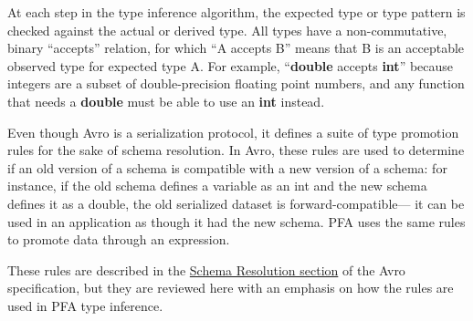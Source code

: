 \documentclass{article}
\theoremstyle{definition}
\begin{document}
At each step in the type inference algorithm, the expected type or type pattern is checked against the actual or derived type.  All types have a non-commutative, binary ``accepts'' relation, for which ``A accepts B'' means that B is an acceptable observed type for expected type A.  For example, ``{\bf double} accepts {\bf int}'' because integers are a subset of double-precision floating point numbers, and any function that needs a {\bf double} must be able to use an {\bf int} instead.

Even though Avro is a serialization protocol, it defines a suite of type promotion rules for the sake of schema resolution.  In Avro, these rules are used to determine if an old version of a schema is compatible with a new version of a schema: for instance, if the old schema defines a variable as an int and the new schema defines it as a double, the old serialized dataset is forward-compatible--- it can be used in an application as though it had the new schema.  PFA uses the same rules to promote data through an expression.

These rules are described in the \href{http://avro.apache.org/docs/1.7.6/spec.html#Schema+Resolution}{Schema Resolution section} of the Avro specification, but they are reviewed here with an emphasis on how the rules are used in PFA type inference.
\end{document}
